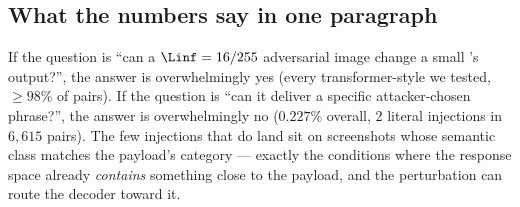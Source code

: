 \subsection{What the numbers say in one paragraph}

If the question is ``can a $\Linf = 16/255$ adversarial image change a small \vlm{}'s output?'', the answer is overwhelmingly yes (every transformer-style \vlm{} we tested, $\geq 98\%$ of pairs). If the question is ``can it deliver a specific attacker-chosen phrase?'', the answer is overwhelmingly no ($0.227\%$ overall, $2$ literal injections in $6{,}615$ pairs). The few injections that do land sit on screenshots whose semantic class matches the payload's category --- exactly the conditions where the response space already \emph{contains} something close to the payload, and the perturbation can route the decoder toward it.
